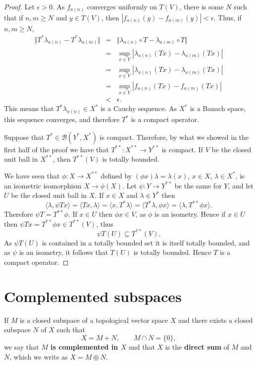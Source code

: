 \documentclass{article}
\newcommand{\inner}[2]{\langle #1, #2 \rangle}
\newcommand{\norm}[1]{\Vert #1 \Vert}
\begin{document}
\begin{proof}
Let $\epsilon>0$. As $f_{a(n)}$ converges uniformly on $T(V)$, there is some $N$ such that if $n,m \geq N$ and $y \in T(V)$, then
$|f_{a(n)}(y)-f_{a(m)}(y)|<\epsilon$. Thus, if $n,m \geq N$,
\begin{eqnarray*}
\norm{T^* \lambda_{a(n)} -T^* \lambda_{a(m)}}&=&\norm{\lambda_{a(n)} \circ T - \lambda_{a(m)} \circ T}\\
&=&\sup_{x \in V} |\lambda_{a(n)}(Tx) - \lambda_{a(m)}(Tx)|\\
&=&\sup_{x \in V} |\lambda_{a(n)}(Tx) - \lambda_{a(m)}(Tx)|\\
&=&\sup_{x \in V} |f_{a(n)}(Tx) - f_{a(m)}(Tx)|\\
&<&\epsilon.
\end{eqnarray*}
This means that $T^*\lambda_{a(n)} \in X^*$ is a Cauchy sequence. As $X^*$ is a Banach space, this sequence converges, and therefore
 $T^*$ is a compact operator. 

Suppose that $T^* \in \mathscr{B}(Y^*,X^*)$ is compact. 
Therefore, by what we showed in the first half of the proof we have that $T^{**}:X^{**} \to Y^{**}$ is compact.
If $V$ be the closed unit ball in $X^{**}$, then $T^{**}(V)$ is totally bounded.

We have seen that $\phi:X \to X^{**}$ defined by
$(\phi x)\lambda=\lambda(x)$, $x \in X$, $\lambda \in X^*$, is an isometric isomorphism $X \to \phi(X)$. Let
$\psi:Y \to Y^{**}$ be the same for $Y$, and 
let $U$ be the closed unit ball in $X$.
If $x \in X$ and $\lambda \in Y^*$ then
\[
\inner{\lambda}{\psi Tx} = \inner{Tx}{\lambda} = \inner{x}{T^* \lambda} = \inner{T^* \lambda}{\phi x}
= \inner{\lambda}{T^{**} \phi x}.
\]
Therefore $\psi T = T^{**} \phi$. If $x \in U$ then $\phi x \in V$, as $\phi$ is an isometry.
Hence if $x \in U$ then  $\psi T x = T^{**} \phi x \in T^{**}(V)$, thus
\[
\psi T(U) \subseteq T^{**}(V).
\]
As $\psi T(U)$ is contained in a totally bounded set it is itself totally bounded, and as $\psi$ is an isometry,
it follows that $T(U)$ is totally bounded. Hence $T$ is a compact operator.
\end{proof}


\section{Complemented subspaces}
If $M$ is a closed subspace of a topological vector space $X$ and there exists a closed subspace $N$ of $X$
such that 
\[
X= M+N, \qquad M \cap N =\{0\},
\]
we say that \textbf{$M$ is complemented in $X$} and that $X$ is the \textbf{direct sum} of $M$ and $N$, which we
write as $X = M \oplus N$.
\end{document}
